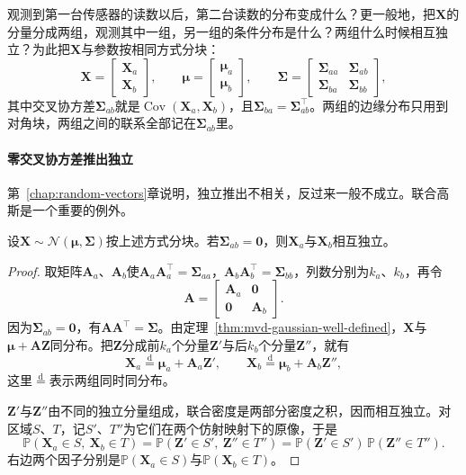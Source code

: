 观测到第一台传感器的读数以后，第二台读数的分布变成什么？更一般地，把$\bm{X}$的分量分成两组，观测其中一组，另一组的条件分布是什么？两组什么时候相互独立？为此把$\bm{X}$与参数按相同方式分块：
\[
 \bm{X}=\begin{bmatrix}\bm{X}_a\\\bm{X}_b\end{bmatrix},\qquad
 \bm{\mu}=\begin{bmatrix}\bm{\mu}_a\\\bm{\mu}_b\end{bmatrix},\qquad
 \bm{\Sigma}=\begin{bmatrix}\bm{\Sigma}_{aa}&\bm{\Sigma}_{ab}\\\bm{\Sigma}_{ba}&\bm{\Sigma}_{bb}\end{bmatrix} ,
\]
其中交叉协方差$\bm{\Sigma}_{ab}$就是$\operatorname{Cov}(\bm{X}_a,\bm{X}_b)$，且$\bm{\Sigma}_{ba}=\bm{\Sigma}_{ab}^{\top}$。两组的边缘分布只用到对角块，两组之间的联系全部记在$\bm{\Sigma}_{ab}$里。

\paragraph{零交叉协方差推出独立}
第~\ref{chap:random-vectors}章说明，独立推出不相关，反过来一般不成立。联合高斯是一个重要的例外。

\begin{theorem}[联合高斯的分块独立]
\label{thm:mvd-gaussian-independence}
设$\bm{X}\sim\mathcal{N}(\bm{\mu},\bm{\Sigma})$按上述方式分块。若$\bm{\Sigma}_{ab}=\bm{0}$，则$\bm{X}_a$与$\bm{X}_b$相互独立。
\end{theorem}

\begin{proof}
取矩阵$\bm{A}_a$、$\bm{A}_b$使$\bm{A}_a\bm{A}_a^{\top}=\bm{\Sigma}_{aa}$，$\bm{A}_b\bm{A}_b^{\top}=\bm{\Sigma}_{bb}$，列数分别为$k_a$、$k_b$，再令
\[
 \bm{A}=\begin{bmatrix}\bm{A}_a&\bm{0}\\\bm{0}&\bm{A}_b\end{bmatrix} .
\]
因为$\bm{\Sigma}_{ab}=\bm{0}$，有$\bm{A}\bm{A}^{\top}=\bm{\Sigma}$。由定理~\ref{thm:mvd-gaussian-well-defined}，$\bm{X}$与$\bm{\mu}+\bm{A}\bm{Z}$同分布。把$\bm{Z}$分成前$k_a$个分量$\bm{Z}'$与后$k_b$个分量$\bm{Z}''$，就有
\[
 \bm{X}_a\overset{\mathrm{d}}{=}\bm{\mu}_a+\bm{A}_a\bm{Z}',\qquad \bm{X}_b\overset{\mathrm{d}}{=}\bm{\mu}_b+\bm{A}_b\bm{Z}'' ,
\]
这里$\overset{\mathrm{d}}{=}$表示两组同时同分布。

$\bm{Z}'$与$\bm{Z}''$由不同的独立分量组成，联合密度是两部分密度之积，因而相互独立。对区域$S$、$T$，记$S'$、$T''$为它们在两个仿射映射下的原像，于是
\[
 \mathbb{P}(\bm{X}_a\in S,\ \bm{X}_b\in T)=\mathbb{P}(\bm{Z}'\in S',\ \bm{Z}''\in T'')=\mathbb{P}(\bm{Z}'\in S')\,\mathbb{P}(\bm{Z}''\in T'') .
\]
右边两个因子分别是$\mathbb{P}(\bm{X}_a\in S)$与$\mathbb{P}(\bm{X}_b\in T)$。
\end{proof}

